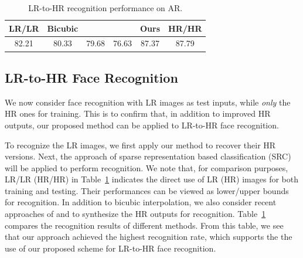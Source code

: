 \begin{table}[!t]
\small
\renewcommand{\arraystretch}{1.2}
\centering
\caption{\small{LR-to-HR recognition performance on AR.}}\label{tab:recog}\vspace{.2cm}
\begin{tabular}{|c|c|c|c|c|c|}
\hline
LR/LR & Bicubic & \cite{convex} & \cite{Jiang_TMM2014} & Ours & HR/HR\\
\hline
82.21 & 80.33 & 79.68 & 76.63 & 87.37 & 87.79\\
\hline
\end{tabular}
\end{table}

\subsection{LR-to-HR Face Recognition}\vspace{-.1cm}

We now consider face recognition with LR images as test inputs, while \emph{only} the HR ones for training. This is to confirm that, in addition to improved HR outputs, our proposed method can be applied to LR-to-HR face recognition.

To recognize the LR images, we first apply our method to recover their HR versions. Next, the approach of sparse representation based classification (SRC) \cite{Wright_PAMI2009} will be applied to perform recognition. We note that, for comparison purposes, LR/LR (HR/HR) in Table~\ref{tab:recog} indicates the direct use of LR (HR) images for both training and testing. Their performances can be viewed as lower/upper bounds for recognition. In addition to bicubic interpolation, we also consider recent approaches of \cite{convex} and \cite{Jiang_TMM2014} to synthesize the HR outputs for recognition. Table~\ref{tab:recog} compares the recognition results of different methods. From this table, we see that our approach achieved the highest recognition rate, which supports the the use of our proposed scheme for LR-to-HR face recognition.




